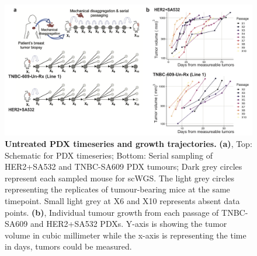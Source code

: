  \begin{figure}
\centering
\includegraphics[width=\textwidth]{Figures/chap4/Untreatedgrowthcurves.png}
	
\caption[Untreated PDX timeseries and growth trajectories]
	{\small
	\textbf{Untreated PDX timeseries and growth trajectories.}
	    \textbf{(a)}, Top: Schematic for PDX timeseries; Bottom: Serial sampling of HER2+SA532 and TNBC-SA609 PDX tumours;
Dark grey circles represent each sampled mouse for scWGS. The light grey circles representing the replicates of tumour-bearing mice at the same timepoint. Small light grey at X6 and X10 represents absent data points.
	    \textbf{(b)}, Individual tumour growth from each passage of TNBC-SA609 and HER2+SA532 PDXs. Y-axis is showing the tumor volume in cubic millimeter while the x-axis is representing the time in days, tumors could be measured.}
	\label{fig:Untreatedgrowthcurves}
\end{figure}



